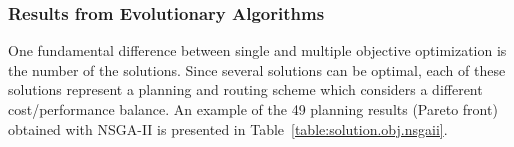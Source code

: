 \documentclass[10pt,journal,compsoc]{IEEEtran}
\newcommand{\Fig}[1]{Fig.~\ref{#1}}
\begin{document}
\subsubsection{Results from Evolutionary Algorithms }
One fundamental difference between single and multiple objective optimization is the number of the solutions. Since several solutions can be optimal, each of these solutions represent a planning and routing scheme which considers a different cost/performance balance. An example of the 49 planning results (Pareto front) obtained with NSGA-II is presented in Table~\ref{table:solution.obj.nsgaii}. 
\end{document}
